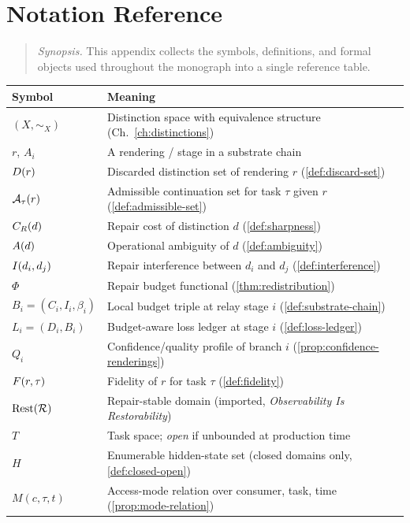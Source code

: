 \chapter{Notation Reference}
\label{app:notation}

\begin{quotation}
\noindent\textit{Synopsis.} This appendix collects the symbols,
definitions, and formal objects used throughout the monograph into a
single reference table.
\end{quotation}


\begin{center}
\begin{tabular}{ll}
\toprule
Symbol & Meaning \\
\midrule
$(X,\sim_X)$ & Distinction space with equivalence structure (Ch.~\ref{ch:distinctions}) \\
$r$, $A_i$ & A rendering / stage in a substrate chain \\
$D(r)$ & Discarded distinction set of rendering $r$ (\cref{def:discard-set}) \\
$\mathcal{A}_{\tau}(r)$ & Admissible continuation set for task $\tau$ given $r$ (\cref{def:admissible-set}) \\
$C_R(d)$ & Repair cost of distinction $d$ (\cref{def:sharpness}) \\
$A(d)$ & Operational ambiguity of $d$ (\cref{def:ambiguity}) \\
$I(d_i,d_j)$ & Repair interference between $d_i$ and $d_j$ (\cref{def:interference}) \\
$\Phi$ & Repair budget functional (\cref{thm:redistribution}) \\
$B_i = (C_i, I_i, \beta_i)$ & Local budget triple at relay stage $i$ (\cref{def:substrate-chain}) \\
$L_i = (D_i, B_i)$ & Budget-aware loss ledger at stage $i$ (\cref{def:loss-ledger}) \\
$Q_i$ & Confidence/quality profile of branch $i$ (\cref{prop:confidence-renderings}) \\
$F(r,\tau)$ & Fidelity of $r$ for task $\tau$ (\cref{def:fidelity}) \\
$\mathrm{Rest}(\mathcal{R})$ & Repair-stable domain (imported, \emph{Observability Is Restorability}) \\
$T$ & Task space; \emph{open} if unbounded at production time \\
$H$ & Enumerable hidden-state set (closed domains only, \cref{def:closed-open}) \\
$M(c,\tau,t)$ & Access-mode relation over consumer, task, time (\cref{prop:mode-relation}) \\

\end{tabular}
\end{center}
